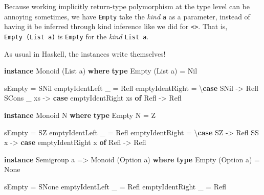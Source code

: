 \documentclass[]{article}
\newenvironment{Shaded}{}{}
\newcommand{\KeywordTok}[1]{\textcolor[rgb]{0.00,0.44,0.13}{\textbf{{#1}}}}
\newcommand{\DataTypeTok}[1]{\textcolor[rgb]{0.56,0.13,0.00}{{#1}}}
\newcommand{\OtherTok}[1]{\textcolor[rgb]{0.00,0.44,0.13}{{#1}}}
\newcommand{\FunctionTok}[1]{\textcolor[rgb]{0.02,0.16,0.49}{{#1}}}
\newcommand{\NormalTok}[1]{{#1}}
\begin{document}
Because working implicitly return-type polymorphism at the type level can be
annoying sometimes, we have \texttt{Empty} take the \emph{kind} \texttt{a} as a
parameter, instead of having it be inferred through kind inference like we did
for \texttt{\textless{}\textgreater{}}. That is, \texttt{Empty\ (List\ a)} is
\texttt{Empty} for the \emph{kind} \texttt{List\ a}.

As usual in Haskell, the instances write themselves!

\begin{Shaded}
\begin{Highlighting}[]
\KeywordTok{instance} \DataTypeTok{Monoid} \NormalTok{(}\DataTypeTok{List} \NormalTok{a) }\KeywordTok{where}
    \KeywordTok{type} \DataTypeTok{Empty} \NormalTok{(}\DataTypeTok{List} \NormalTok{a) }\FunctionTok{=} \DataTypeTok{Nil}

    \NormalTok{sEmpty }\FunctionTok{=} \DataTypeTok{SNil}
    \NormalTok{emptyIdentLeft _ }\FunctionTok{=} \DataTypeTok{Refl}
    \NormalTok{emptyIdentRight  }\FunctionTok{=} \NormalTok{\textbackslash{}}\KeywordTok{case}
      \DataTypeTok{SNil} \OtherTok{->} \DataTypeTok{Refl}
      \DataTypeTok{SCons} \NormalTok{_ xs }\OtherTok{->}
        \KeywordTok{case} \NormalTok{emptyIdentRight xs }\KeywordTok{of}
          \DataTypeTok{Refl} \OtherTok{->} \DataTypeTok{Refl}

\KeywordTok{instance} \DataTypeTok{Monoid} \DataTypeTok{N} \KeywordTok{where}
    \KeywordTok{type} \DataTypeTok{Empty} \DataTypeTok{N} \FunctionTok{=} \DataTypeTok{Z}

    \NormalTok{sEmpty }\FunctionTok{=} \DataTypeTok{SZ}
    \NormalTok{emptyIdentLeft _ }\FunctionTok{=} \DataTypeTok{Refl}
    \NormalTok{emptyIdentRight  }\FunctionTok{=} \NormalTok{\textbackslash{}}\KeywordTok{case}
      \DataTypeTok{SZ} \OtherTok{->} \DataTypeTok{Refl}
      \DataTypeTok{SS} \NormalTok{x }\OtherTok{->} \KeywordTok{case} \NormalTok{emptyIdentRight x }\KeywordTok{of}
        \DataTypeTok{Refl} \OtherTok{->} \DataTypeTok{Refl}

\KeywordTok{instance} \DataTypeTok{Semigroup} \NormalTok{a }\OtherTok{=>} \DataTypeTok{Monoid} \NormalTok{(}\DataTypeTok{Option} \NormalTok{a) }\KeywordTok{where}
    \KeywordTok{type} \DataTypeTok{Empty} \NormalTok{(}\DataTypeTok{Option} \NormalTok{a) }\FunctionTok{=} \DataTypeTok{None}

    \NormalTok{sEmpty }\FunctionTok{=} \DataTypeTok{SNone}
    \NormalTok{emptyIdentLeft  _ }\FunctionTok{=} \DataTypeTok{Refl}
    \NormalTok{emptyIdentRight _ }\FunctionTok{=} \DataTypeTok{Refl}
\end{Highlighting}
\end{Shaded}
\end{document}
